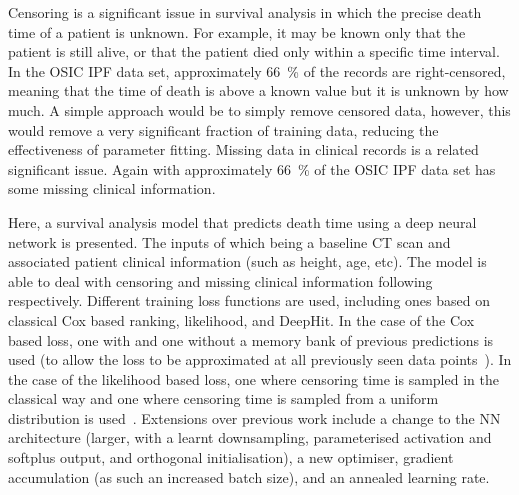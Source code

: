     Censoring is a significant issue in survival analysis in which the precise death time of a patient is unknown. For example, it may be known only that the patient is still alive, or that the patient died only within a specific time interval. In the \gls{OSIC} \gls{IPF} data set, approximately \SI{66}{\percent} of the records are right-censored, meaning that the time of death is above a known value but it is unknown by how much. A simple approach would be to simply remove censored data, however, this would remove a very significant fraction of training data, reducing the effectiveness of parameter fitting. Missing data in clinical records is a related significant issue. Again with approximately \SI{66}{\percent} of the \gls{OSIC} \gls{IPF} data set has some missing clinical information.

    Here, a survival analysis model that predicts death time using a deep neural network is presented. The inputs of which being a baseline \gls{CT} scan and associated patient clinical information (such as height, age, etc). The model is able to deal with censoring and missing clinical information following~\cite{Shahin2023DeepAnalysis, Shahin2022SurvivalData} respectively. Different training loss functions are used, including ones based on classical Cox based ranking, likelihood, and DeepHit. In the case of the Cox based loss, one with and one without a memory bank of previous predictions is used (to allow the loss to be approximated at all previously seen data points~\cite{Shahin2022SurvivalData}). In the case of the likelihood based loss, one where censoring time is sampled in the classical way and one where censoring time is sampled from a uniform distribution is used~\cite{Shahin2023DeepAnalysis}. Extensions over previous work include a change to the \gls{NN} architecture (larger, with a learnt downsampling, parameterised activation and softplus output, and orthogonal initialisation), a new optimiser, gradient accumulation (as such an increased batch size), and an annealed learning rate.
